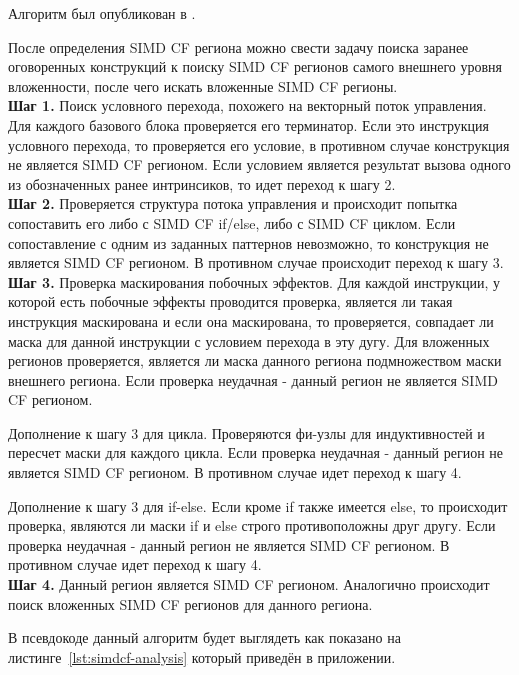 Алгоритм был опубликован в \cite{vladimirov2022opt}.

После определения SIMD CF региона можно свести задачу поиска заранее оговоренных конструкций к поиску SIMD CF регионов самого внешнего уровня вложенности, после чего искать вложенные SIMD CF регионы.\\

\textbf{Шаг 1.} Поиск условного перехода, похожего на векторный поток управления. Для каждого базового блока проверяется его терминатор. Если это инструкция условного перехода, то проверяется его условие, в противном случае конструкция не является SIMD CF регионом. Если условием является результат вызова одного из обозначенных ранее интринсиков, то идет переход к шагу 2.\\

\textbf{Шаг 2.} Проверяется структура потока управления и происходит попытка сопоставить его либо с SIMD CF if/else, либо с SIMD CF циклом. Если сопоставление с одним из заданных паттернов невозможно, то конструкция не является SIMD CF регионом. В противном случае происходит переход к шагу 3.\\

\textbf{Шаг 3.} Проверка маскирования побочных эффектов. Для каждой инструкции, у которой есть побочные эффекты проводится проверка, является ли такая инструкция маскирована и если она маскирована, то проверяется, совпадает ли маска для данной инструкции с условием перехода в эту дугу. Для вложенных регионов проверяется, является ли маска данного региона подмножеством маски внешнего региона. Если проверка неудачная - данный регион не является SIMD CF регионом.

Дополнение к шагу 3 для цикла. Проверяются фи-узлы для индуктивностей и пересчет маски для каждого цикла. Если проверка неудачная - данный регион не является SIMD CF регионом. В противном случае идет переход к шагу 4.

Дополнение к шагу 3 для if-else. Если кроме if также имеется else, то происходит проверка, являются ли маски if и else строго противоположны друг другу. Если проверка неудачная - данный регион не является SIMD CF регионом. В противном случае идет переход к шагу 4.\\

\textbf{Шаг 4.} Данный регион является SIMD CF регионом. Аналогично происходит поиск вложенных SIMD CF регионов для данного региона.

В псевдокоде данный алгоритм будет выглядеть как показано на листинге~\ref{lst:simdcf-analysis} который приведён в приложении.

